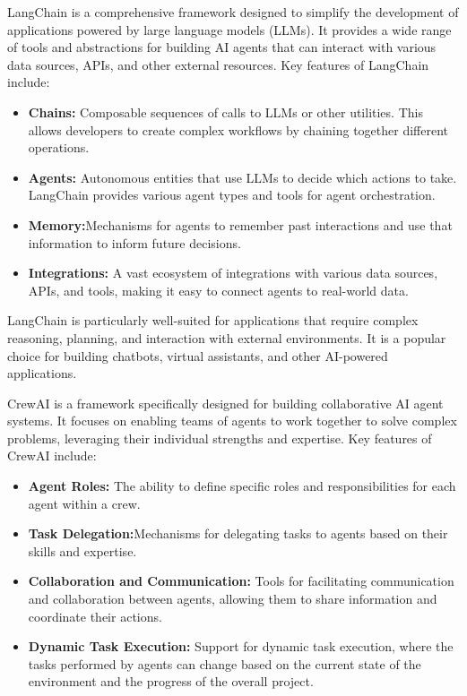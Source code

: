 \documentclass[a4paper,headinclude=on,footinclude=on,12pt,oneside]{scrbook}
\begin{document}
LangChain is a comprehensive framework designed to simplify the development of applications powered by large language models (LLMs). It provides a wide range of tools and abstractions for building AI agents that can interact with various data sources, APIs, and other external resources. Key features of LangChain include:

\begin{itemize}
\item \textbf{Chains:}  Composable sequences of calls to LLMs or other utilities. This allows developers to create complex workflows by chaining together different operations.
\item \textbf{Agents:} Autonomous entities that use LLMs to decide which actions to take. LangChain provides various agent types and tools for agent orchestration.
\item \textbf{Memory:}Mechanisms for agents to remember past interactions and use that information to inform future decisions.
\item \textbf{Integrations:} A vast ecosystem of integrations with various data sources, APIs, and tools, making it easy to connect agents to real-world data.
\end{itemize}

LangChain is particularly well-suited for applications that require complex reasoning, planning, and interaction with external environments. It is a popular choice for building chatbots, virtual assistants, and other AI-powered applications.


CrewAI is a framework specifically designed for building collaborative AI agent systems. It focuses on enabling teams of agents to work together to solve complex problems, leveraging their individual strengths and expertise. Key features of CrewAI include:

\begin{itemize}
\item \textbf{Agent Roles:} The ability to define specific roles and responsibilities for each agent within a crew.
\item \textbf{Task Delegation:}Mechanisms for delegating tasks to agents based on their skills and expertise.
\item \textbf{Collaboration and Communication:} Tools for facilitating communication and collaboration between agents, allowing them to share information and coordinate their actions.
\item \textbf{Dynamic Task Execution:} Support for dynamic task execution, where the tasks performed by agents can change based on the current state of the environment and the progress of the overall project.
\end{itemize}
\end{document}
